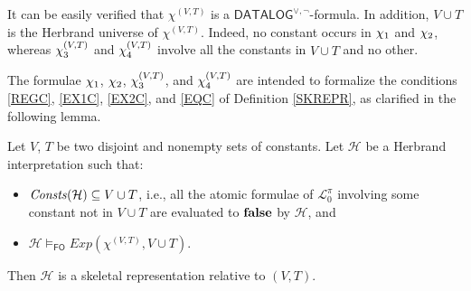 \documentclass[a4paper]{llncs}
\newcommand{\DisjDatalog}{\ensuremath{\mathsf{DATALOG}^{\vee,\neg}}\xspace}
\newcommand{\Elpizero}{\ensuremath{\mathcal{L}_{0}^{\pi}}\xspace}
\newcommand{\HExp}{Exp}
\newcommand{\hinter}{\ensuremath{\mathcal{H}}}
\newcommand{\fomodels}[2]{#1 \models_{\mathsf{FO}} #2}
\begin{document}
It can be easily verified that $\chi^{(V,T)}$ is a
$\DisjDatalog$-formula. In addition, $V \cup T$ is the Herbrand
universe of $\chi^{(V,T)}$. Indeed, no constant occurs in
$\chi_1$ and $\chi_2$, whereas $\chi_3^{(V,T)}$ and $\chi_4^{(V,T)}$ involve
all the constants in $V \cup T$ and no other.

%
The formulae $\chi_1$, $\chi_2$, $\chi_3^{(V,T)}$, and $\chi_4^{(V,T)}$ are intended 
to formalize the conditions \ref{REGC}, \ref{EX1C}, \ref{EX2C}, and 
\ref{EQC} of
Definition \ref{SKREPR}, as clarified in the following lemma.


\begin{lemma}\label{HERTOSK}
Let $V$, $T$ be two disjoint and nonempty sets of constants.
Let $\hinter$ be a Herbrand interpretation such that:
\begin{itemize}
  \item $\Consts(\hinter)\subseteq V \cup T$, i.e.,
  all the atomic formulae of $\Elpizero$ involving some constant not in
  $V \cup T$ are evaluated to $\mathbf{false}$ by $\hinter$, and
  \item $\fomodels{\hinter}{\HExp(\chi^{(V,T)}, V \cup T)}$.
\end{itemize}
Then $\hinter$ is a skeletal representation relative to $(V,T)$.
\end{lemma}
\end{document}
